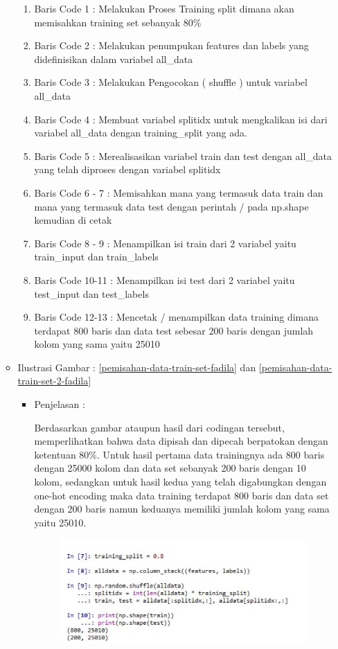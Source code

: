 \begin{enumerate}
\begin{itemize}
\begin{enumerate}
\item Baris Code 1 : Melakukan Proses Training split dimana akan memisahkan training set sebanyak 80\%
\item Baris Code 2 : Melakukan penumpukan features dan labels yang didefinisikan dalam variabel all\_data
\item Baris Code 3 : Melakukan Pengocokan ( shuffle ) untuk variabel all\_data 
\item Baris Code 4 : Membuat variabel splitidx untuk mengkalikan isi dari variabel all\_data dengan training\_split yang ada.
\item Baris Code 5 : Merealisasikan variabel train dan test dengan all\_data yang telah diproses dengan variabel splitidx
\item Baris Code 6 - 7 : Memisahkan mana yang termasuk data train dan mana yang termasuk data test dengan perintah / pada np.shape kemudian di cetak
\item Baris Code 8 - 9 : Menampilkan isi train dari 2 variabel yaitu train\_input dan train\_labels
\item Baris Code 10-11 : Menampilkan isi test dari 2 variabel yaitu test\_input dan test\_labels
\item Baris Code 12-13 : Mencetak / menampilkan data training dimana terdapat 800 baris dan data test sebesar 200 baris dengan jumlah kolom yang sama yaitu 25010
\par
\end{enumerate}
\item  Ilustrasi Gambar : \ref{pemisahan-data-train-set-fadila} dan  \ref{pemisahan-data-train-set-2-fadila}
\begin{itemize}
\item Penjelasan : 
\par Berdasarkan gambar ataupun hasil dari codingan tersebut, memperlihatkan bahwa data dipisah dan dipecah berpatokan dengan ketentuan 80\%. Untuk hasil pertama data trainingnya ada 800 baris dengan 25000 kolom dan data set sebanyak 200 baris dengan 10 kolom, sedangkan untuk hasil kedua yang telah digabungkan dengan one-hot encoding maka data training terdapat 800 baris dan data set dengan 200 baris namun keduanya memiliki jumlah kolom yang sama yaitu 25010.
\par
\par
\par
\begin{figure}[!hbtp]
\centering
\includegraphics[scale=0.2]{figures/pemisahan-data-train-set-fadila.jpg}

\end{figure}
\end{itemize}
\end{itemize}
\end{enumerate}
